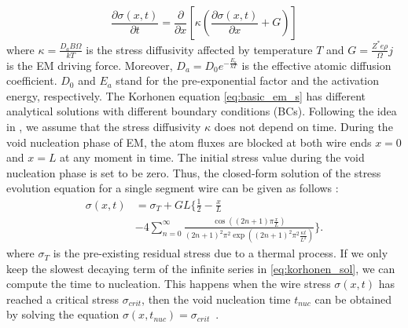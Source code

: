 %
\begin{equation}
\label{eq:basic_em_s}
\frac{\partial \sigma(x,t)}{\partial t}=\frac{\partial }{\partial x}\left[\kappa\left(\frac{\partial \sigma(x,t)}{\partial x}+G\right)\right]
\end{equation}
where $\kappa=\frac{D_aB\Omega}{kT}$ is the stress diffusivity
affected by temperature $T$ and $G=\frac{Z^*e\rho}{\Omega}j$ is the EM
driving force. Moreover, $D_a=D_0e^{-\frac{E_a}{kT}}$ is the effective
atomic diffusion coefficient. $D_0$ and $E_a$ stand for the
pre-exponential factor and the activation energy, respectively. The
Korhonen equation \eqref{eq:basic_em_s} has different analytical
solutions with different boundary conditions (BCs). Following the idea
in \cite{Korhonen:jap1993}, we assume that the stress diffusivity
$\kappa$ does not depend on time. During the void nucleation phase of
EM, the atom fluxes are blocked at both wire ends $x=0$ and $x=L$ at
any moment in time. The initial stress value during the void
nucleation phase is set to be zero. Thus, the closed-form solution of
the stress evolution equation for a single segment wire can be given
as follows \cite{Korhonen:jap1993}:
\begin{equation} \label{eq:korhonen_sol}
\begin{split}
\sigma(x,t)&= \sigma_T+ GL\{\frac{1}{2}-\frac{x}{L}\\
&-4\sum\limits_{n=0}^{\infty}\frac{\cos((2n+1)\pi
\frac{x}{L})}{(2n+1)^2\pi^2\exp((2n+1)^2\pi^2\frac{\kappa
t}{L^2})}\}.
\end{split}
\end{equation}
where $\sigma_T$ is the pre-existing residual stress due to a thermal
process. If we only keep the slowest decaying term of the infinite
series in \eqref{eq:korhonen_sol}, we can compute the time to
nucleation. This happens when the wire stress $\sigma(x,t)$ has
reached a critical stress $\sigma_{crit}$, then the void
nucleation time $t_{nuc}$ can be obtained by solving the equation
$\sigma(x,t_{nuc})=\sigma_{crit}$~\cite{HuangYu:DAC'14}.

